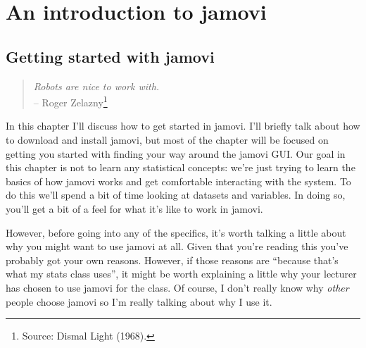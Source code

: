 \documentclass[
]{book}
\begin{document}
\hypertarget{part-an-introduction-to-jamovi}{%
\part{An introduction to jamovi}\label{part-an-introduction-to-jamovi}}

\hypertarget{getting-started-with-jamovi}{%
\chapter{Getting started with jamovi}\label{getting-started-with-jamovi}}

\begin{quote}
\emph{Robots are nice to work with.}\\
-- Roger Zelazny\footnote{Source: Dismal Light (1968).}
\end{quote}

In this chapter I'll discuss how to get started in jamovi. I'll briefly talk about how to download and install jamovi, but most of the chapter will be focused on getting you started with finding your way around the jamovi GUI. Our goal in this chapter is not to learn any statistical concepts: we're just trying to learn the basics of how jamovi works and get comfortable interacting with the system. To do this we'll spend a bit of time looking at datasets and variables. In doing so, you'll get a bit of a feel for what it's like to work in jamovi.

However, before going into any of the specifics, it's worth talking a little about why you might want to use jamovi at all. Given that you're reading this you've probably got your own reasons. However, if those reasons are ``because that's what my stats class uses'', it might be worth explaining a little why your lecturer has chosen to use jamovi for the class. Of course, I don't really know why \emph{other} people choose jamovi so I'm really talking about why I use it.
\end{document}
